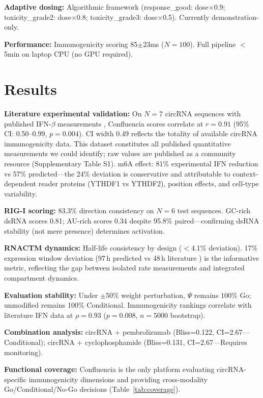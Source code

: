 \documentclass{article}
\begin{document}
\textbf{Adaptive dosing:} Algorithmic framework (response\_good: dose$\times$0.9; toxicity\_grade2: dose$\times$0.8; toxicity\_grade3: dose$\times$0.5). Currently demonstration-only.

\textbf{Performance:} Immunogenicity scoring 85$\pm$23ms ($N=100$). Full pipeline $<$5min on laptop CPU (no GPU required).

\section{Results}
\textbf{Literature experimental validation:} On $N=7$ circRNA sequences with published IFN-$\beta$ measurements \citep{chen2019,zhang2016}, Confluencia scores correlate at $r=0.91$ (95\% CI: 0.50--0.99, $p=0.004$). CI width 0.49 reflects the totality of available circRNA immunogenicity data. This dataset constitutes all published quantitative measurements we could identify; raw values are published as a community resource (Supplementary Table S1). m6A effect: 81\% experimental IFN reduction vs 57\% predicted---the 24\% deviation is conservative and attributable to context-dependent reader proteins (YTHDF1 vs YTHDF2), position effects, and cell-type variability.

\textbf{RIG-I scoring:} 83.3\% direction consistency on $N=6$ test sequences. GC-rich dsRNA scores 0.81; AU-rich scores 0.34 despite 95.8\% paired---confirming dsRNA stability (not mere presence) determines activation.

\textbf{RNACTM dynamics:} Half-life consistency by design ($<$4.1\% deviation). 17\% expression window deviation (97\,h predicted vs 48\,h literature \citep{wesselhoeft2018}) is the informative metric, reflecting the gap between isolated rate measurements and integrated compartment dynamics.

\textbf{Evaluation stability:} Under $\pm$50\% weight perturbation, $\Psi$ remains 100\% Go; unmodified remains 100\% Conditional. Immunogenicity rankings correlate with literature IFN data at $\rho=0.93$ ($p=0.008$, $n=5000$ bootstrap).

\textbf{Combination analysis:} circRNA + pembrolizumab (Bliss=0.122, CI=2.67---Conditional); circRNA + cyclophosphamide (Bliss=0.131, CI=2.67---Requires monitoring).

\textbf{Functional coverage:} Confluencia is the only platform evaluating circRNA-specific immunogenicity dimensions and providing cross-modality Go/Conditional/No-Go decisions (Table~\ref{tab:coverage}).
\end{document}
